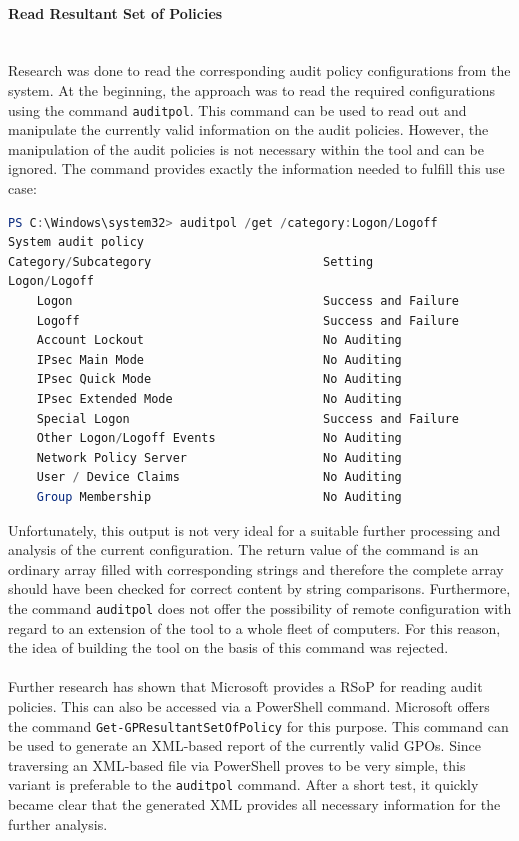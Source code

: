 \paragraph{Read Resultant Set of Policies} \ \\
Research was done to read the corresponding audit policy configurations from the system. At the beginning, the approach was to read the required configurations using the command \lstinline|auditpol|. \cite{auditpol} This command can be used to read out and manipulate the currently valid information on the audit policies. However, the manipulation of the audit policies is not necessary within the tool and can be ignored. The command provides exactly the information needed to fulfill this use case:
\begin{lstlisting}[caption=auditpol, language=PowerShell]
PS C:\Windows\system32> auditpol /get /category:Logon/Logoff
System audit policy
Category/Subcategory                        Setting
Logon/Logoff
    Logon                                   Success and Failure
    Logoff                                  Success and Failure
    Account Lockout                         No Auditing
    IPsec Main Mode                         No Auditing
    IPsec Quick Mode                        No Auditing
    IPsec Extended Mode                     No Auditing
    Special Logon                           Success and Failure
    Other Logon/Logoff Events               No Auditing
    Network Policy Server                   No Auditing
    User / Device Claims                    No Auditing
    Group Membership                        No Auditing
\end{lstlisting}
Unfortunately, this output is not very ideal for a suitable further processing and analysis of the current configuration. The return value of the command is an ordinary array filled with corresponding strings and therefore the complete array should have been checked for correct content by string comparisons. Furthermore, the command \lstinline|auditpol| does not offer the possibility of remote configuration with regard to an extension of the tool to a whole fleet of computers. For this reason, the idea of building the tool on the basis of this command was rejected.
\\\\
Further research has shown that Microsoft provides a RSoP \cite{RSoP} for reading audit policies. This can also be accessed via a PowerShell command. Microsoft offers the command \lstinline|Get-GPResultantSetOfPolicy| \cite{GetGPResultantSetOfPolicy} for this purpose. This command can be used to generate an XML-based report of the currently valid GPOs. Since traversing an XML-based file via PowerShell proves to be very simple, this variant is preferable to the \lstinline|auditpol| command. After a short test, it quickly became clear that the generated XML provides all necessary information for the further analysis.


